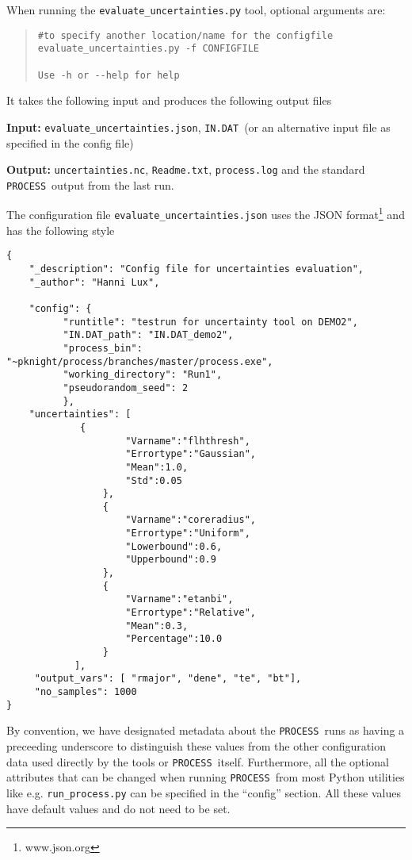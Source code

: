 \documentclass[10pt,a4paper]{article}
\newcommand{\process}{\mbox{\texttt{PROCESS}}}
\newcommand{\indat}{\mbox{\texttt{IN.DAT}}}
\begin{document}
When running the \texttt{evaluate\_uncertainties.py} tool, optional arguments are:
\begin{quote}
\begin{verbatim}
#to specify another location/name for the configfile
evaluate_uncertainties.py -f CONFIGFILE

Use -h or --help for help
\end{verbatim}
\end{quote}
It takes the following input and produces the following output files
\begin{description}
\item{\textbf{Input:}}
 \texttt{evaluate\_uncertainties.json}, \indat\ (or an alternative input file as specified in the config file)
                                
\item{\textbf{Output:}}
\texttt{uncertainties.nc}, \texttt{Readme.txt}, \texttt{process.log} and the standard \process\ output from the last run. 
\end{description}
The configuration file \texttt{evaluate\_uncertainties.json} uses the JSON format\footnote{www.json.org} and has the following style
\begin{framed}
\begin{verbatim}
{
	"_description": "Config file for uncertainties evaluation",
	"_author": "Hanni Lux",
	
	"config": {
		  "runtitle": "testrun for uncertainty tool on DEMO2",
		  "IN.DAT_path": "IN.DAT_demo2",
		  "process_bin": "~pknight/process/branches/master/process.exe",
		  "working_directory": "Run1",
		  "pseudorandom_seed": 2
		  },
	"uncertainties": [
		     {
               	     "Varname":"flhthresh",
               	     "Errortype":"Gaussian",
               	     "Mean":1.0,
               	     "Std":0.05
          	     },          
          	     {
               	     "Varname":"coreradius",
               	     "Errortype":"Uniform",
               	     "Lowerbound":0.6,
               	     "Upperbound":0.9
          	     },
          	     {
               	     "Varname":"etanbi",
               	     "Errortype":"Relative",
               	     "Mean":0.3,
               	     "Percentage":10.0
          	     } 
	     	],
     "output_vars": [ "rmajor", "dene", "te", "bt"],
     "no_samples": 1000    
}
\end{verbatim}
\end{framed}
By convention, we have designated metadata about the \process\ runs as having a preceeding underscore to distinguish these values from the other configuration data used directly by the tools or \process\ itself. Furthermore, all the optional attributes that can be changed when running \process\ from most Python utilities like e.g. \texttt{run\_process.py} can be specified in the ``config'' section. All these values have default values and do not need to be set.
\end{document}

